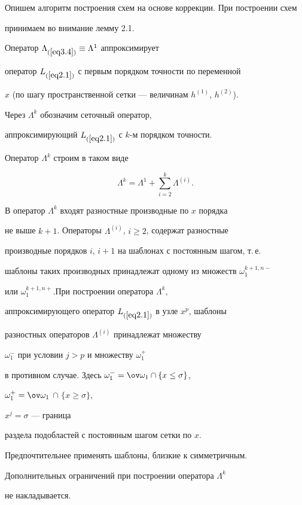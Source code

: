 Опишем алгоритм построения схем на основе коррекции. При построении схем


принимаем во внимание лемму 2.1.





Оператор $\Lambda_{(\ref{eq3.4})}\equiv \Lambda^1$ аппроксимирует


оператор $L_{(\ref{eq2.1})}$ с первым порядком точности по переменной


$x$ (по шагу пространственной сетки --- величинам $h^{(1)}$, $h^{(2)}$).


Через $\Lambda^k$ обозначим сеточный оператор,


аппроксимирующий $L_{(\ref{eq2.1})}$ с $k$-м порядком точности.


Оператор $\Lambda^k$ строим в таком виде


$$


\Lambda^k=\Lambda^1+\sum^k_{i=2}\Lambda^{(i)}.


$$


В оператор $\Lambda^k$ входят разностные производные по $x$ порядка


не выше $k+1$. Операторы $\Lambda^{(i)}$, $i\ge 2$, содержат разностные


производные порядков $i$, $i+1$ на шаблонах с постоянным шагом, т.\,е.


шаблоны таких производных принадлежат одному из множеств $\omega_1^{k+1,n-}$


или $\omega_1^{k+1,n+}$.При построении оператора $\Lambda^k$,


аппроксимирующего оператор $L_{(\ref{eq2.1})}$ в узле $x^p$, шаблоны


разностных операторов $\Lambda^{(i)}$ принадлежат множеству


$\omega^{-}_1$ при условии $j>p$ и множеству $\omega_1^{+}$


в противном случае. Здесь $\omega^-_1=\ovo_1\cap\{x\le\sigma\}$,


$\omega_1^+=\ovo_1$ $\cap$ $\{x\ge\sigma\}$,


$x^j=\sigma$ --- граница


раздела подобластей с постоянным шагом сетки по $x$.


Предпочтительнее применять шаблоны, близкие к симметричным.


Дополнительных ограничений при построении оператора $\Lambda^k$


не накладывается.





